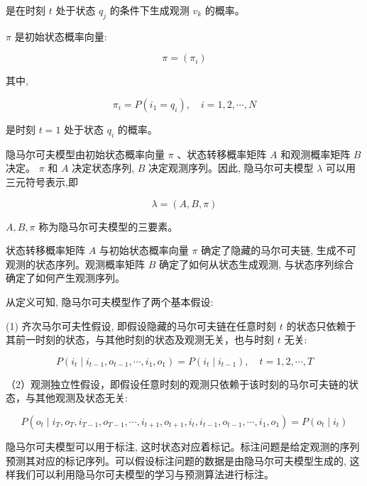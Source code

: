 \documentclass[10pt]{article}
\begin{document}
是在时刻 $t$ 处于状态 $q_{j}$ 的条件下生成观测 $v_{k}$ 的概率。

$\pi$ 是初始状态概率向量:


\begin{equation*}
\pi=\left(\pi_{i}\right) \tag{10.5}
\end{equation*}


其中,


\begin{equation*}
\pi_{i}=P\left(i_{1}=q_{i}\right), \quad i=1,2, \cdots, N \tag{10.6}
\end{equation*}


是时刻 $t=1$ 处于状态 $q_{i}$ 的概率。

隐马尔可夫模型由初始状态概率向量 $\pi$ 、状态转移概率矩阵 $A$ 和观测概率矩阵 $B$ 决定。 $\pi$ 和 $A$ 决定状态序列, $B$ 决定观测序列。因此, 隐马尔可夫模型 $\lambda$ 可以用三元符号表示,即


\begin{equation*}
\lambda=(A, B, \pi) \tag{10.7}
\end{equation*}


$A, B, \pi$ 称为隐马尔可夫模型的三要素。

状态转移概率矩阵 $A$ 与初始状态概率向量 $\pi$ 确定了隐藏的马尔可夫链, 生成不可观测的状态序列。观测概率矩阵 $B$ 确定了如何从状态生成观测, 与状态序列综合确定了如何产生观测序列。

从定义可知, 隐马尔可夫模型作了两个基本假设:

(1) 齐次马尔可夫性假设, 即假设隐藏的马尔可夫链在任意时刻 $t$ 的状态只依赖于其前一时刻的状态，与其他时刻的状态及观测无关，也与时刻 $t$ 无关:


\begin{equation*}
P\left(i_{t} \mid i_{t-1}, o_{t-1}, \cdots, i_{1}, o_{1}\right)=P\left(i_{t} \mid i_{t-1}\right), \quad t=1,2, \cdots, T \tag{10.8}
\end{equation*}


（2）观测独立性假设，即假设任意时刻的观测只依赖于该时刻的马尔可夫链的状态，与其他观测及状态无关:


\begin{equation*}
P\left(o_{t} \mid i_{T}, o_{T}, i_{T-1}, o_{T-1}, \cdots, i_{t+1}, o_{t+1}, i_{t}, i_{t-1}, o_{t-1}, \cdots, i_{1}, o_{1}\right)=P\left(o_{t} \mid i_{t}\right) \tag{10.9}
\end{equation*}


隐马尔可夫模型可以用于标注, 这时状态对应着标记。标注问题是给定观测的序列预测其对应的标记序列。可以假设标注问题的数据是由隐马尔可夫模型生成的, 这样我们可以利用隐马尔可夫模型的学习与预测算法进行标注。
\end{document}

